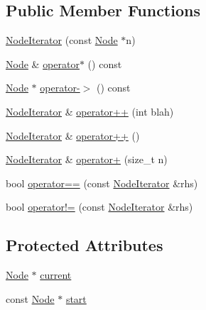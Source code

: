 \subsection*{Public Member Functions}
\begin{DoxyCompactItemize}
\item 
\hyperlink{class_node_1_1_node_iterator_a6c8a582279465a5aa2d27bb9c0e71359}{Node\+Iterator} (const \hyperlink{class_node}{Node} $\ast$n)
\item 
\hyperlink{class_node}{Node} \& \hyperlink{class_node_1_1_node_iterator_a2b87cc748e7f197939e8d8b5a0e526ca}{operator$\ast$} () const
\item 
\hyperlink{class_node}{Node} $\ast$ \hyperlink{class_node_1_1_node_iterator_ab325945a6eccc93043b9fd35705529d9}{operator-\/$>$} () const
\item 
\hyperlink{class_node_1_1_node_iterator}{Node\+Iterator} \& \hyperlink{class_node_1_1_node_iterator_a13144818341346563030e7c0adab769c}{operator++} (int blah)
\item 
\hyperlink{class_node_1_1_node_iterator}{Node\+Iterator} \& \hyperlink{class_node_1_1_node_iterator_a906b69f8095b2e8e8ddfd68a40d9df48}{operator++} ()
\item 
\hyperlink{class_node_1_1_node_iterator}{Node\+Iterator} \& \hyperlink{class_node_1_1_node_iterator_a5ed6466d0f2200d90507769d4a790a9f}{operator+} (size\+\_\+t n)
\item 
bool \hyperlink{class_node_1_1_node_iterator_a5c01bff31ec6a91410c08ab70110cb1f}{operator==} (const \hyperlink{class_node_1_1_node_iterator}{Node\+Iterator} \&rhs)
\item 
bool \hyperlink{class_node_1_1_node_iterator_af76058ef35f25f3bcf681a4841554f58}{operator!=} (const \hyperlink{class_node_1_1_node_iterator}{Node\+Iterator} \&rhs)
\end{DoxyCompactItemize}
\subsection*{Protected Attributes}
\begin{DoxyCompactItemize}
\item 
\hyperlink{class_node}{Node} $\ast$ \hyperlink{class_node_1_1_node_iterator_aef4bbf58890919058172facd8b91238a}{current}
\item 
const \hyperlink{class_node}{Node} $\ast$ \hyperlink{class_node_1_1_node_iterator_a7f1dc14103049a99cd9929946ecbd0f0}{start}
\end{DoxyCompactItemize}


